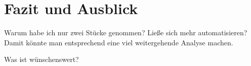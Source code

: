 \chapter{Fazit und Ausblick}
\label{chap:Fazit und Ausblick}



Warum habe ich nur zwei Stücke genommen? Ließe sich mehr automatisieren? Damit könnte man entsprechend eine viel weitergehende Analyse machen.

Was ist wünschenswert?